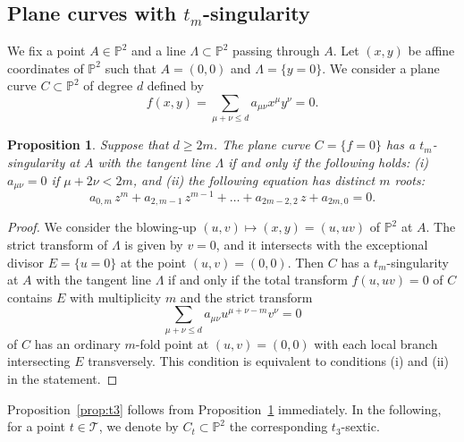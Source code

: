 \documentclass{math}
\theoremstyle{plain}
\newtheorem{proposition}[theorem]{Proposition}
\numberwithin{equation}{section}
\newcommand{\PP}{\mathord{\mathbb  P}}
\newcommand{\TTT}{\mathord{\mathcal T}}
\newcommand{\mtan}[1]{t_{#1}}
\begin{document}
\subsection{Plane curves with \texorpdfstring{$\mtan{m}$}{tm}-singularity}\label{subsec:planecurveswithmtan}
%
We fix a point $A\in \PP^2$
and a line $\Lambda\subset \PP^2$ passing through $A$.
Let $(x, y)$ be affine coordinates 
of $\PP^2$ such that $A=(0,0)$ and $\Lambda=\{y=0\}$.
We consider a plane curve  $C\subset\PP^2$ of degree $d$
defined by 
\[
f(x, y)=\sum_{\mu+\nu\le d} a_{\mu\nu} x^{\mu} y^{\nu}=0.
\]
%
\begin{proposition}\label{prop:tm}
Suppose that $d\ge 2m$.
The plane curve $C=\{f=0\}$ has a $\mtan{m}$-singularity 
at $A$ with the tangent line $\Lambda$ if and only if the following holds:
%
(i) $a_{\mu\nu}=0$ if $\mu+2\nu<2m$, and 
(ii)  the following equation has distinct $m$ roots:
\[
a_{0, m}\, z^m+a_{2, m-1} \, z^{m-1} + \dots +a_{2m-2, 2}\, z+ a_{2m, 0}=0.
\]
%
\end{proposition}
%
\begin{proof}
We consider the blowing-up 
$(u, v)\mapsto (x, y)=(u, uv)$
of $\PP^2$ at $A$.
The strict transform of $\Lambda$ is given by $v=0$,
and it intersects with the exceptional divisor $E=\{u=0\}$
at the point $(u, v)=(0,0)$.
Then $C$ has a $\mtan{m}$-singularity 
at $A$ with the tangent line $\Lambda$ if and only if 
the  total transform
$f(u, uv)=0$
of $C$ contains $E$ with multiplicity $m$
and the strict transform
\[
\sum_{\mu+\nu\le d} a_{\mu\nu} u^{\mu+\nu -m} v^{\nu}=0
\]
of $C$ has an ordinary $m$-fold point at $(u, v)=(0,0)$
with each local branch intersecting $E$ transversely.
This  condition is  equivalent to conditions (i) and (ii) 
in the statement.
\end{proof}
%
Proposition~\ref{prop:t3} follows from Proposition~\ref{prop:tm} immediately.
%
%
In the following, 
for a point $t\in \TTT$, we denote by $C_t\subset\PP^2$ the corresponding $\mtan{3}$-sextic.
%
\end{document}
